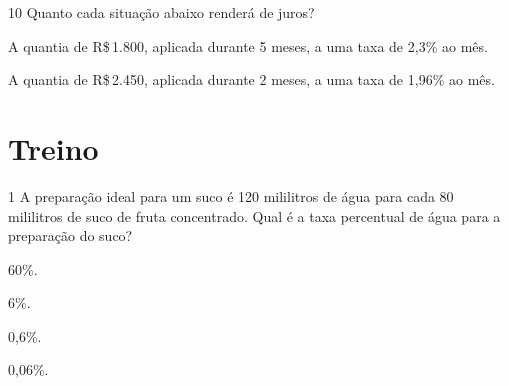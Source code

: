 


\num{10} Quanto cada situação abaixo renderá de juros?

\begin{escolha}[itemsep=0pt]
\item{A quantia de R\$\,1.800, aplicada durante 5 meses, a uma taxa de 2,3\% ao mês.}





\item{A quantia de R\$\,2.450, aplicada durante 2 meses, a uma taxa de 1,96\% ao mês.}



\end{escolha}

\section*{Treino}

\num{1} A preparação ideal para um suco é 120 mililitros de água para cada 80
mililitros de suco de fruta concentrado. Qual é a taxa percentual de
água para a preparação do suco?

\begin{escolha}[itemsep=0pt]
\item 60\%.
\item 6\%.
\item 0,6\%.
\item 0,06\%.
\end{escolha}




